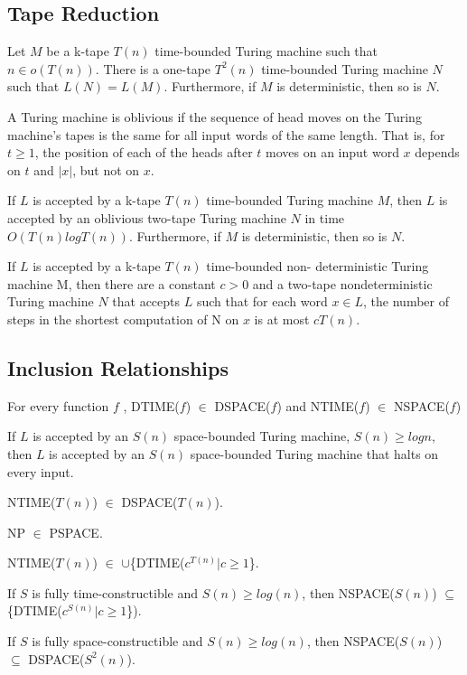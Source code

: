 \subsection{Tape Reduction}

 Let $M$ be a k-tape $T(n)$ time-bounded Turing machine
such that $n \in o(T(n))$. There is a one-tape $T^2(n)$ time-bounded
Turing machine
$N$ such that $L(N) = L(M)$. Furthermore, if $M$ is deterministic, then so is
$N$.

A Turing machine is oblivious if the sequence of head moves on
the
Turing machine's tapes is the same for all input words of the same
length. That is,
for $t \ge 1$, the position of each of the heads after $t$ moves on an
input word $x$ depends on $t$ and $|x|$, but not on $x$.

 If $L$ is accepted by a k-tape $T(n)$ time-bounded
Turing machine $M$, then $L$ is accepted by an oblivious two-tape Turing machine
$N$ in time $O(T(n)logT(n))$. Furthermore, if $M$ is deterministic, then so is
$N$.

 If $L$ is accepted by a k-tape $T(n)$ time-bounded non-
deterministic Turing machine M, then there are a constant $c > 0$ and a two-tape
nondeterministic Turing machine $N$ that accepts $L$ such that for each word
$x \in L$,
the number of steps in the shortest computation of N on $x$ is at most $cT(n)$.

\subsection{Inclusion Relationships}

 For every function $f$ ,
DTIME($f$) $\in$ DSPACE($f$) and NTIME($f$) $\in$ NSPACE($f$)

 If $L$ is accepted by an $S(n)$ space-bounded Turing machine, 
$S(n) \ge log n$, then $L$ is accepted by an $S(n)$ space-bounded
Turing machine that halts on every input.

  NTIME($T(n)$) $\in$ DSPACE($T(n)$).

 NP $\in$ PSPACE.

 NTIME($T(n)$) $\in$ $\cup$\{DTIME($c^{T(n)}| c \ge 1$\}.

 If $S$ is fully time-constructible and $S(n) \ge
log(n)$, then NSPACE($S(n)$) $\subseteq$ \{DTIME($c^{S(n)}|c \ge 1$\}).

 If $S$ is fully space-constructible and $S(n) \ge
log(n)$, then NSPACE($S(n)$) $\subseteq$ DSPACE($S^2(n)$).

